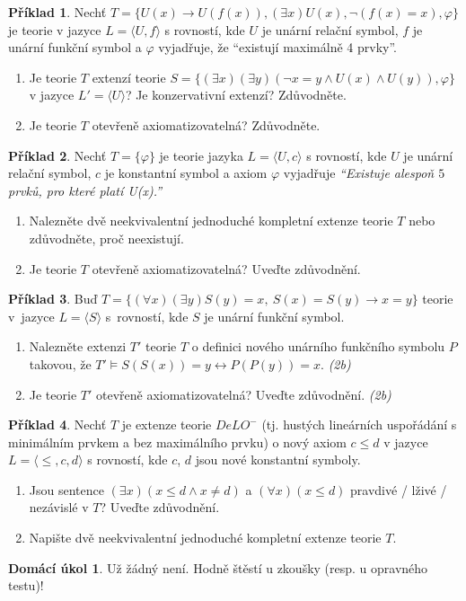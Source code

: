 \documentclass[a4paper]{article}
\theoremstyle{definition}
\newtheorem{problem}{Příklad}
\newtheorem*{ukol}{Domácí úkol}
\begin{document}
\medskip\begin{problem}
    Nechť $T = \{U(x) \to U(f(x)), (\exists x)U(x), \neg (f(x) = x), \varphi\}$ je teorie v jazyce $L = \langle U, f \rangle$ s rovností, kde $U$ je unární relační symbol, $f$ je unární funkční symbol a $\varphi$ vyjadřuje, že ``existují maximálně 4 prvky''.
    \begin{enumerate}
    \item Je teorie $T$ extenzí teorie $S = \{ (\exists x)(\exists y)(\neg x = y \land U(x) \land U(y)), \varphi \}$ v jazyce $L' = \langle U \rangle$? Je konzervativní extenzí? Zdůvodněte.
    \item Je teorie $T$ otevřeně axiomatizovatelná? Zdůvodněte.
    \end{enumerate} 
\end{problem}

\medskip\begin{problem}
Nechť $T=\{\varphi\}$ je teorie jazyka $L=\langle U, c \rangle$ s rovností, kde $U$ je unární relační symbol, $c$ je konstantní symbol a axiom $\varphi$ vyjadřuje \emph{``Existuje alespoň $5$ prvků, pro které platí U(x).''}
\begin{enumerate}
\item Nalezněte dvě neekvivalentní jednoduché kompletní extenze teorie $T$ nebo zdůvodněte, proč neexistují.
\item Je teorie $T$ otevřeně axiomatizovatelná? Uveďte zdůvodnění.
\end{enumerate}
\end{problem}


\medskip\begin{problem} %
    Buď $T=\{(\forall x)(\exists y) S(y)=x,\ S(x)=S(y)\to x=y\}$ teorie v~jazyce $L=\langle S\rangle$ s~rovností, kde $S$ je unární funkční symbol.
    \begin{enumerate}
    \item Nalezněte extenzi $T'$ teorie $T$ o definici nového unárního funkčního symbolu $P$ takovou, že $T' \models S(S(x))=y \leftrightarrow P(P(y))=x$. {\it (2b)}
    \item Je teorie $T'$ otevřeně axiomatizovatelná? Uveďte zdůvodnění. {\it (2b)}
    \end{enumerate} 
\end{problem} 


\medskip\begin{problem}
    Nechť $T$ je extenze teorie $DeLO^-$ (tj. hustých lineárních uspořádání s minimálním prvkem a bez maximálního prvku) o nový axiom $c \le d$ v jazyce $L=\langle \le,c,d\rangle$ s rovností, kde $c$, $d$ jsou nové konstantní symboly.
    \begin{enumerate}
    \item Jsou sentence $(\exists x)(x\le d \wedge x \ne d)$ a $(\forall x)(x \le d)$ pravdivé / lživé / nezávislé v $T$? Uveďte zdůvodnění.
    \item Napište dvě neekvivalentní jednoduché kompletní extenze teorie $T$.
    \end{enumerate} 
\end{problem}


\medskip\begin{ukol}
Už žádný není. Hodně štěstí u zkoušky (resp. u opravného testu)!
\end{ukol}
\end{document}
